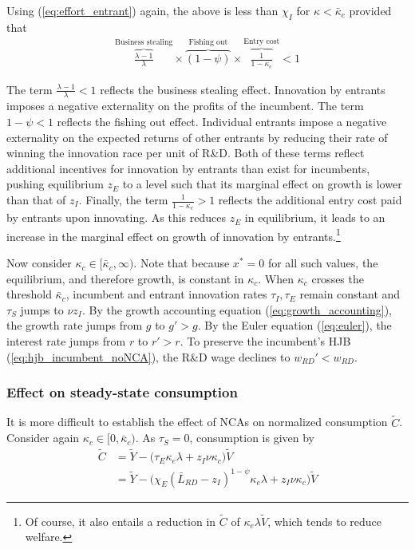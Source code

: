 \documentclass[12pt,english]{article}
\theoremstyle{remark}
\begin{document}
Using (\ref{eq:effort_entrant}) again, the above is less than $\chi_I$ for $\kappa < \bar{\kappa}_c$ provided that
\begin{align}
	\overbrace{\frac{\lambda-1}{\lambda}}^{\textrm{Business stealing}} \times \overbrace{(1-\psi)}^{\textrm{Fishing out}} \times  \overbrace{\frac{1}{1-\kappa_{e}}}^{\textrm{Entry cost}}< 1 \label{cs:growth_decreasing_condition}
\end{align}

The term $\frac{\lambda - 1}{\lambda} < 1$ reflects the business stealing effect. Innovation by entrants imposes a negative externality on the profits of the incumbent. The term $1-\psi < 1$ reflects the fishing out effect. Individual entrants impose a negative externality on the expected returns of other entrants by reducing their rate of winning the innovation race per unit of R\&D. Both of these terms reflect additional incentives for innovation by entrants than exist for incumbents, pushing equilibrium $z_E$ to a level such that its marginal effect on growth is lower than that of $z_I$. Finally, the term $\frac{1}{1-\kappa_e} > 1$ reflects the additional entry cost paid by entrants upon innovating. As this reduces $z_E$ in equilibrium, it leads to an increase in the marginal effect on growth of innovation by entrants.\footnote{Of course, it also entails a reduction in $\tilde{C}$ of $\kappa_e \lambda \tilde{V}$, which tends to reduce welfare.}

Now consider $\kappa_c \in [\bar{\kappa}_c,\infty)$. Note that because $x^* = 0$ for all such values, the equilibrium, and therefore growth, is constant in $\kappa_c$. When $\kappa_c$ crosses the threshold $\bar{\kappa}_c$, incumbent and entrant innovation rates $\tau_I,\tau_E$ remain constant and $\tau_S$ jumps to $\nu z_I$. By the growth accounting equation (\ref{eq:growth_accounting}), the growth rate jumps from $g$ to $g' > g$. By the Euler equation (\ref{eq:euler}), the interest rate jumps from $r$ to $r'>r$. To preserve the incumbent's HJB (\ref{eq:hjb_incumbent_noNCA}), the R\&D wage declines to $w_{RD}' < w_{RD}$.


\subsubsection{Effect on steady-state consumption}

It is more difficult to establish the effect of NCAs on normalized consumption $\tilde{C}$. Consider again $\kappa_c \in [0, \bar{\kappa}_c)$. As $\tau_S = 0$, consumption is given by 
\begin{align*}
	\tilde{C} &= \tilde{Y} - \Big( \tau_E  \kappa_e \lambda + z_I \nu \kappa_c \Big) \tilde{V} \\
	  &= \tilde{Y} - \Big( \chi_E (\bar{L}_{RD} - z_I)^{1-\psi} \kappa_e \lambda + z_I \nu \kappa_c \Big) \tilde{V}
\end{align*}
\end{document}
